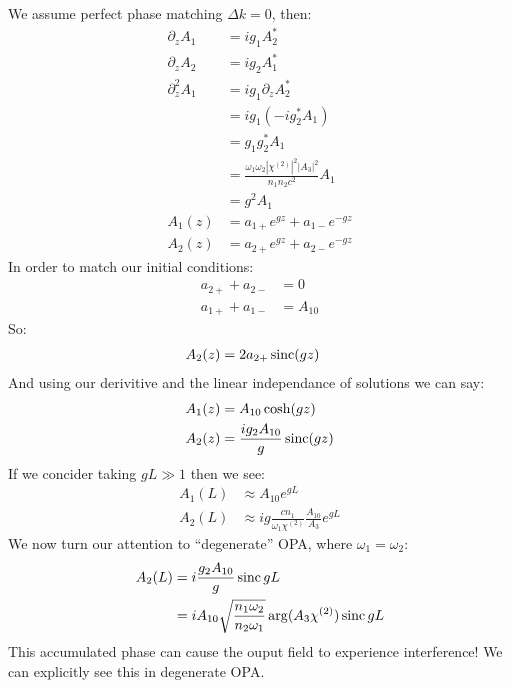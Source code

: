 We assume perfect phase matching $\Delta k=0$, then:
\begin{align*}
	\partial_z A_1 &= ig_1 A_2^* \\
	\partial_z A_2 &= ig_2 A_1^* \\
	\partial_z^2 A_1 &= ig_1 \partial_z A_2^* \\
	&= ig_1 (-ig_2^* A_1) \\
	&= g_1 g_2^* A_1 \\
	&= \frac{\omega_1\omega_2|\chi^{(2)}|^2 |A_3|^2}{n_1n_2c^2}A_1 \\
	&= g^2A_1 \\
	A_1(z) &= a_{1+} e^{gz} + a_{1-} e^{-gz} \\
	A_2(z) &= a_{2+} e^{gz} + a_{2-} e^{-gz}
\end{align*}
In order to match our initial conditions:
\begin{align*}
	a_{2+} + a_{2-} &= 0 \\
	a_{1+} + a_{1-} &= A_{10}
\end{align*}
So:
\begin{align*}
	A_2(z) &= 2a_{2+} \operatorname{sinc}(gz)
\end{align*}
And using our derivitive and the linear independance of solutions we can say:
\begin{align*}
	A_1(z) &= A_{10}\cosh(gz) \\
	A_2(z) &= \frac{ig_2A_{10}}{g}\operatorname{sinc}(gz) 
\end{align*}
If we concider taking $gL\gg 1$ then we see:
\begin{align*}
	A_1(L) &\approx A_{10} e^{gL} \\
	A_2(L) &\approx ig \frac{cn_1}{\omega_1\chi^{(2)}} \frac{A_{10}}{A_3} e^{gL}
\end{align*}
We now turn our attention to ``degenerate'' OPA, where $\omega_1=\omega_2$:
\begin{align*}
	A_2(L) &= i\frac{g_2 A_{10}}{g} \operatorname{sinc} gL \\
	&= iA_{10}\sqrt{\frac{n_1\omega_2}{n_2\omega_1}} \arg(A_3\chi^{(2)})\operatorname{sinc} gL
\end{align*}
This accumulated phase can cause the ouput field to experience interference! We can explicitly see this in degenerate OPA.
